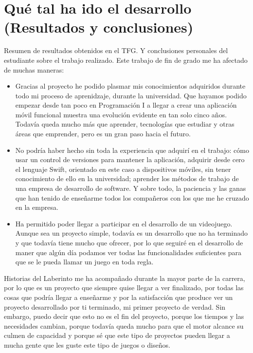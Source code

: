 \chapter{Qué tal ha ido el desarrollo (Resultados y conclusiones)}
Resumen de resultados obtenidos en el TFG. Y conclusiones personales del estudiante sobre el trabajo realizado.
Este trabajo de fin de grado me ha afectado de muchas maneras:

\begin{itemize}
	\item Gracias al proyecto he podido plasmar mis conocimientos adquiridos durante todo mi proceso de aprenidzaje, durante la universidad. Que hayamos podido empezar desde tan poco en Programación I a llegar a crear una aplicación móvil funcional muestra una evolución evidente en tan solo cinco años. Todavía queda mucho más que aprender, tecnologías que estudiar y otras áreas que emprender, pero es un gran paso hacia el futuro.
	\item No podría haber hecho sin toda la experiencia que adquirí en el trabajo: cómo usar un control de versiones para mantener la aplicación, adquirir desde cero el lenguaje Swift, orientado en este caso a dispositivos móviles, sin tener conocimiento de ello en la universidad; aprender los métodos de trabajo de una empresa de desarrollo de software. Y sobre todo, la paciencia y las ganas que han tenido de enseñarme todos los compañeros con los que me he cruzado en la empresa.
	\item Ha permitido poder llegar a participar en el desarrollo de un videojuego. Aunque sea un proyecto simple, todavía es un desarrollo que no ha terminado y que todavía tiene mucho que ofrecer, por lo que seguiré en el desarrollo de maner que algún día podamos ver todas las funcionalidades suficientes para que se le pueda llamar un juego en toda regla.
\end{itemize}

Historias del Laberinto me ha acompañado durante la mayor parte de la carrera, por lo que es un proyecto que siempre quise llegar a ver finalizado, por todas las cosas que podría llegar a enseñarme y por la satisfacción que produce ver un proyecto desarrollado por ti terminado, mi primer proyecto de verdad.
Sin embargo, puedo decir que esto no es el fin del proyecto, porque los tiempos y las necesidades cambian, porque todavía queda mucho para que el motor alcance su culmen de capacidad y porque sé que este tipo de proyectos pueden llegar a mucha gente que les guste este tipo de juegos o diseños.

